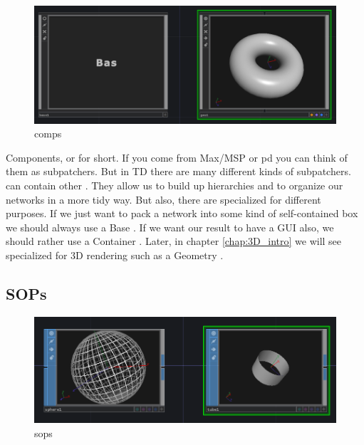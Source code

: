 \begin{figure}[H]
	\begin{center}
		\includegraphics[width = 14cm]{img/comps.png}
		\caption{comps}
		\label{fig:comps}
	\end{center}
\end{figure}
Components, or \COMPs for short. If you come from Max/MSP or pd you can think of them as subpatchers. But in TD there are many different kinds of subpatchers.\\
\COMPs can contain other \OPs. They allow us to build up hierarchies and to organize our networks in a more tidy way. But also, there are specialized \COMPs for different purposes. If we just want to pack a network into some kind of  self-contained box we should always use a Base \COMP {}. If we want our result to have a GUI also, we should rather use a Container \COMP {}. Later, in chapter \ref{chap:3D_intro} we will see specialized \COMPs for 3D rendering such as a Geometry \COMP.


\subsection{SOPs} %
\label{sub:sops}

\begin{figure}[H]
	\begin{center}
		\includegraphics[width = 14cm]{img/sops.png}
		\caption{sops}
		\label{fig:sops}
	\end{center}
\end{figure}

